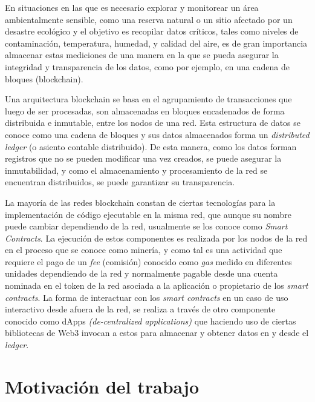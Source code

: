 En situaciones en las que es necesario explorar y monitorear un área ambientalmente sensible, como una reserva natural o un sitio afectado por un desastre ecológico y el objetivo es recopilar datos críticos, tales como niveles de contaminación, temperatura, humedad, y calidad del aire, es de gran importancia almacenar estas mediciones de una manera en la que se pueda asegurar la integridad y transparencia de los datos, como por ejemplo, en una cadena de bloques (blockchain).

Una arquitectura blockchain se basa en el agrupamiento de transacciones que luego de ser procesadas, son almacenadas en bloques encadenados de forma distribuida e inmutable, entre los nodos de una red. Esta estructura de datos se conoce como una cadena de bloques y sus datos almacenados forma un \textit{distributed ledger} (o asiento contable distribuido). De esta manera, como los datos forman registros que no se pueden modificar una vez creados, se puede asegurar la inmutabilidad, y como el almacenamiento y procesamiento de la red se encuentran distribuidos, se puede garantizar su transparencia.

La mayoría de las redes blockchain constan de ciertas tecnologías para la implementación de código ejecutable en la misma red, que aunque su nombre puede cambiar dependiendo de la red, usualmente se los conoce como \textit{Smart Contracts}. La ejecución de estos componentes es realizada por los nodos de la red en el proceso que se conoce como minería, y como tal es una actividad que requiere el pago de un \textit{fee} (comisión) conocido como \textit{gas} medido en diferentes unidades dependiendo de la red y normalmente pagable desde una cuenta nominada en el token de la red asociada a la aplicación o propietario de los \textit{smart contracts}.
La  forma de interactuar con los \textit{smart contracts} en un caso de uso interactivo desde afuera de la red, se realiza a través de otro componente conocido como dApps \textit{(de-centralized applications)} que haciendo uso de ciertas bibliotecas de Web3 invocan a estos para almacenar y obtener datos en y desde el \textit{ledger}.




\section{Motivación del trabajo}



